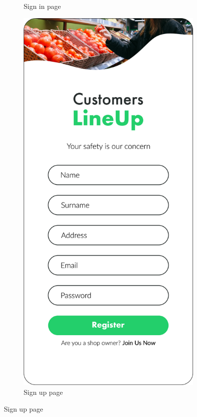 \begin{figure}[H]
\begin{subfigure}[t]{0.28\textwidth}
        \caption*{Sign in page}
    \end{subfigure}
    \quad
    \begin{subfigure}[t]{0.28\textwidth} 
        \includegraphics{../mockups/sign_up}
        \caption*{Sign up page}
    \end{subfigure}
\end{figure}

